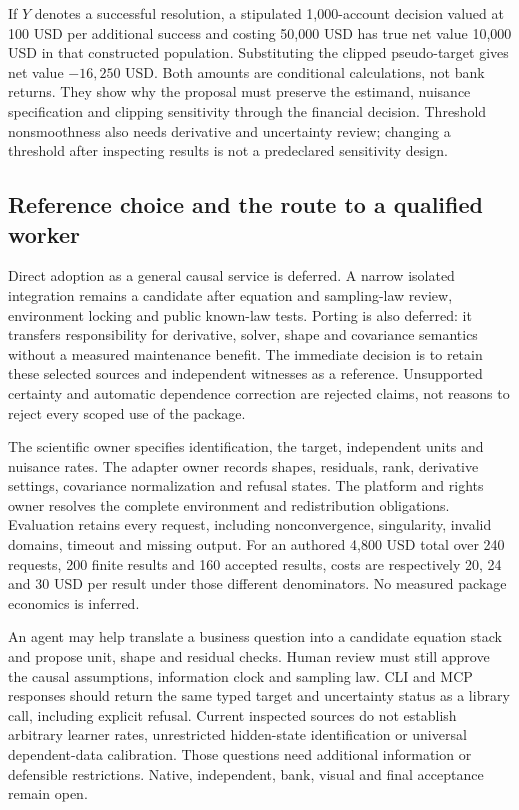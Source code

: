 If $Y$ denotes a successful resolution, a stipulated 1,000-account
decision valued at 100 USD per additional success and costing 50,000 USD
has true net value 10,000 USD in that constructed population. Substituting
the clipped pseudo-target gives net value $-16,250$ USD. Both amounts are
conditional calculations, not bank returns. They show why the proposal
must preserve the estimand, nuisance specification and clipping sensitivity
through the financial decision. Threshold nonsmoothness also needs
derivative and uncertainty review; changing a threshold after inspecting
results is not a predeclared sensitivity design.
\citep{exec24_delicatessen_choice}

\subsection{Reference choice and the route to a qualified worker}
Direct adoption as a general causal service is deferred. A narrow isolated
integration remains a candidate after equation and sampling-law review,
environment locking and public known-law tests. Porting is also deferred:
it transfers responsibility for derivative, solver, shape and covariance
semantics without a measured maintenance benefit. The immediate decision
is to retain these selected sources and independent witnesses as a
reference. Unsupported certainty and automatic dependence correction are
rejected claims, not reasons to reject every scoped use of the package.
\citep{exec24_delicatessen_choice}

The scientific owner specifies identification, the target, independent
units and nuisance rates. The adapter owner records shapes, residuals,
rank, derivative settings, covariance normalization and refusal states.
The platform and rights owner resolves the complete environment and
redistribution obligations. Evaluation retains every request, including
nonconvergence, singularity, invalid domains, timeout and missing output.
For an authored 4,800 USD total over 240 requests, 200 finite results and
160 accepted results, costs are respectively 20, 24 and 30 USD per result
under those different denominators. No measured package economics is
inferred.\citep{exec24_delicatessen_choice}

An agent may help translate a business question into a candidate equation
stack and propose unit, shape and residual checks. Human review must still
approve the causal assumptions, information clock and sampling law. CLI
and MCP responses should return the same typed target and uncertainty
status as a library call, including explicit refusal. Current inspected
sources do not establish arbitrary learner rates, unrestricted hidden-state
identification or universal dependent-data calibration. Those questions
need additional information or defensible restrictions. Native, independent,
bank, visual and final acceptance remain open.
\citep{exec24_delicatessen_choice}
